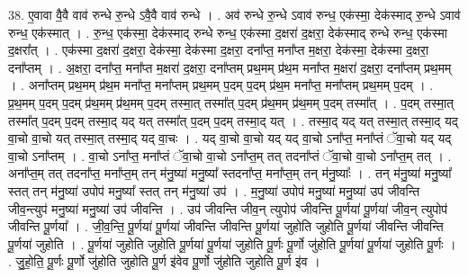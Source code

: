 \documentclass[17pt]{extarticle}
\begin{document}
38. ए॒वावा वै॒वै वाव॑ रुन्धे रु॒न्धे ऽवै॒वै वाव॑ रुन्धे । . अव॑ रुन्धे रु॒न्धे ऽवाव॑ रुन्ध॒ एक॑स्मा॒ देक॑स्माद् रु॒न्धे ऽवाव॑ रुन्ध॒ एक॑स्मात् । . रु॒न्ध॒ एक॑स्मा॒ देक॑स्माद् रुन्धे रुन्ध॒ एक॑स्मा द॒क्षरा॑ द॒क्षरा॒ देक॑स्माद् रुन्धे रुन्ध॒ एक॑स्मा द॒क्षरा᳚त् । . एक॑स्मा द॒क्षरा॑ द॒क्षरा॒ देक॑स्मा॒ देक॑स्मा द॒क्षरा॒ दना᳚प्त॒ मना᳚प्त म॒क्षरा॒ देक॑स्मा॒ देक॑स्मा द॒क्षरा॒ दना᳚प्तम् । . अ॒क्षरा॒ दना᳚प्त॒ मना᳚प्त म॒क्षरा॑ द॒क्षरा॒ दना᳚प्तम् प्रथ॒मम् प्र॑थ॒म मना᳚प्त म॒क्षरा॑ द॒क्षरा॒ दना᳚प्तम् प्रथ॒मम् । . अना᳚प्तम् प्रथ॒मम् प्र॑थ॒म मना᳚प्त॒ मना᳚प्तम् प्रथ॒मम् प॒दम् प॒दम् प्र॑थ॒म मना᳚प्त॒ मना᳚प्तम् प्रथ॒मम् प॒दम् । . प्र॒थ॒मम् प॒दम् प॒दम् प्र॑थ॒मम् प्र॑थ॒मम् प॒दम् तस्मा॒त् तस्मा᳚त् प॒दम् प्र॑थ॒मम् प्र॑थ॒मम् प॒दम् तस्मा᳚त् । . प॒दम् तस्मा॒त् तस्मा᳚त् प॒दम् प॒दम् तस्मा॒द् यद् यत् तस्मा᳚त् प॒दम् प॒दम् तस्मा॒द् यत् । . तस्मा॒द् यद् यत् तस्मा॒त् तस्मा॒द् यद् वा॒चो वा॒चो यत् तस्मा॒त् तस्मा॒द् यद् वा॒चः । . यद् वा॒चो वा॒चो यद् यद् वा॒चो ऽना᳚प्त॒ मना᳚प्तं ॅवा॒चो यद् यद् वा॒चो ऽना᳚प्तम् । . वा॒चो ऽना᳚प्त॒ मना᳚प्तं ॅवा॒चो वा॒चो ऽना᳚प्त॒म् तत् तदना᳚प्तं ॅवा॒चो वा॒चो ऽना᳚प्त॒म् तत् । . अना᳚प्त॒म् तत् तदना᳚प्त॒ मना᳚प्त॒म् तन् म॑नु॒ष्या॑ मनु॒ष्या᳚ स्तदना᳚प्त॒ मना᳚प्त॒म् तन् म॑नु॒ष्याः᳚ । . तन् म॑नु॒ष्या॑ मनु॒ष्या᳚ स्तत् तन् म॑नु॒ष्या॑ उपोप॑ मनु॒ष्या᳚ स्तत् तन् म॑नु॒ष्या॑ उप॑ । . म॒नु॒ष्या॑ उपोप॑ मनु॒ष्या॑ मनु॒ष्या॑ उप॑ जीवन्ति जीव॒न्त्युप॑ मनु॒ष्या॑ मनु॒ष्या॑ उप॑ जीवन्ति । . उप॑ जीवन्ति जीव॒न् त्युपोप॑ जीवन्ति पू॒र्णया॑ पू॒र्णया॑ जीव॒न् त्युपोप॑ जीवन्ति पू॒र्णया᳚ । . जी॒व॒न्ति॒ पू॒र्णया॑ पू॒र्णया॑ जीवन्ति जीवन्ति पू॒र्णया॑ जुहोति जुहोति पू॒र्णया॑ जीवन्ति जीवन्ति पू॒र्णया॑ जुहोति । . पू॒र्णया॑ जुहोति जुहोति पू॒र्णया॑ पू॒र्णया॑ जुहोति पू॒र्णः पू॒र्णो जु॑होति पू॒र्णया॑ पू॒र्णया॑ जुहोति पू॒र्णः । . जु॒हो॒ति॒ पू॒र्णः पू॒र्णो जु॑होति जुहोति पू॒र्ण इ॑वेव पू॒र्णो जु॑होति जुहोति पू॒र्ण इ॑व । \newline
\end{document}
